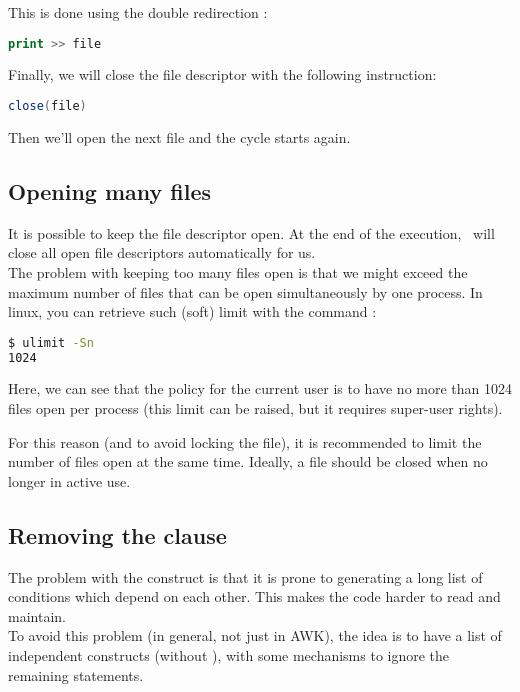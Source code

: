 This is done using the double redirection \cmd{>>} :

\begin{lstlisting}[language=awk]
print >> file
\end{lstlisting}

\medskip


Finally, we will close the file descriptor with the following instruction:
\begin{lstlisting}[language=awk]
close(file)
\end{lstlisting}

Then we'll open the next file and the cycle starts again.



\subsection*{Opening many files}


It is possible to keep the file descriptor open. At the end of the execution, \awk\ will close all open file descriptors automatically for us. \\

The problem with keeping too many files open is that we might exceed the maximum number of files that can be open simultaneously by one process. In linux, you can retrieve such (soft) limit with the command  :
\begin{lstlisting}[language=sh]
$ ulimit -Sn
1024
\end{lstlisting}

Here, we can see that the policy for the current user is to have no more than 1024 files open per process (this limit can be raised, but it requires super-user rights).

For this reason (and to avoid locking the file), it is recommended to limit the number of files open at the same time. Ideally, a file should be closed when no longer in active use.


\newpage
\subsection*{Removing the  clause}

The problem with the  construct is that it is prone to generating a long list of conditions which depend on each other. This makes the code harder to read and maintain. \\

To avoid this problem (in general, not just in AWK), the idea is to have a list of independent  constructs (without ), with some mechanisms to ignore the remaining  statements. \\

